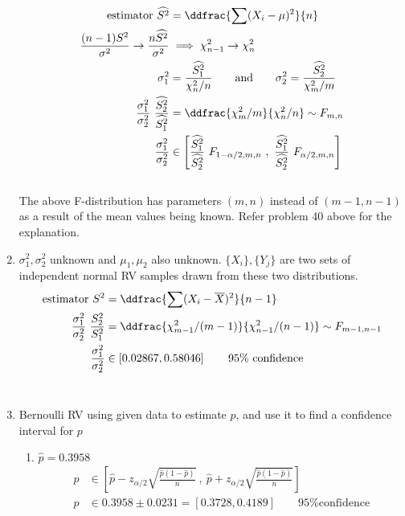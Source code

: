 \begin{enumerate}
	
		\begin{align}		
			\text{estimator } \widehat{S^2} &= \ddfrac{\sum (X_i - \mu)^2}{n} \nonumber \\
			\frac{(n-1)S^2}{\sigma^2} \to \frac{n\widehat{S^2}}{\sigma^2} &\implies \chi^2_{n-1} \to \chi^2_{n} \nonumber \\
			\sigma_1^2 &= \frac{\widehat{S_1^2}}{\chi_n^2/n} \qquad \text{and} \qquad \sigma_2^2 = \frac{\widehat{S_2^2}}{\chi_m^2/m} \\
			\frac{\sigma_1^2}{\sigma_2^2}\ \frac{\widehat{S_2^2}}{\widehat{S_1^2}} &= \ddfrac{\chi_m^2/m}{\chi_n^2/n} \sim F_{m, n} \\
			\frac{\sigma_1^2}{\sigma_2^2} &\in \left[ \frac{\widehat{S_1^2}}{\widehat{S_2^2}}\ F_{1 - \alpha/2, m, n}\ ,\ \frac{\widehat{S_1^2}}{\widehat{S_2^2}}\ F_{\alpha/2, m, n} \right]
		\end{align}\\
		
		The above F-distribution has parameters $ (m, n) $ instead of $ (m-1, n-1) $ as a result of the mean values being known. Refer problem 40 above for the explanation.\\
	
	
	\item  $ \sigma_1^2, \sigma_2^2 $ unknown and $ \mu_1, \mu_2 $ also unknown. $ \{X_i\}, \{Y_j\} $ are two sets of independent normal RV samples drawn from these two distributions. \\
	
	
		\begin{align}		
			\text{estimator } S^2 &= \ddfrac{\sum (X_i - \overline{X})^2}{n-1} \nonumber \\
			\frac{\sigma_1^2}{\sigma_2^2}\ \frac{S_2^2}{S_1^2} &= \ddfrac{\chi_{m-1}^2/(m-1)}{\chi_{n-1}^2/(n-1)} \sim F_{m-1, n-1} \\
			\frac{\sigma_1^2}{\sigma_2^2} &\in \left[0.02867, 0.58046\right] \qquad \text{95\% confidence}
		\end{align}\\
	
	
	\item Bernoulli RV using given data to estimate $ \widehat{p} $, and use it to find a confidence interval for $ p $ \\
	
		\begin{enumerate}
			\item $ \widehat{p}  = 0.3958$ \\
			\begin{align}
				p &\in \left[ \widehat{p} - z_{\alpha/2}\sqrt{\frac{\widehat{p}(1-\widehat{p})}{n}}\ ,\ \widehat{p} + z_{\alpha/2}\sqrt{\frac{\widehat{p}(1-\widehat{p})}{n}}  \right] \nonumber \\
				p &\in 0.3958 \pm 0.0231 = [0.3728, 0.4189] \qquad \text{95\% confidence}
			\end{align} \\
			

\end{enumerate}
\end{enumerate}
